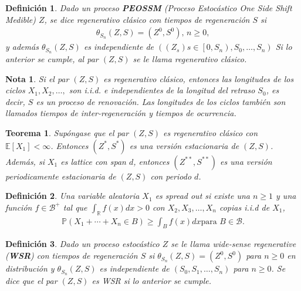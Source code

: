 \documentclass{article}
\newtheorem{Def}{Definición}[section]
\newtheorem{Teo}{Teorema}[section]
\newtheorem{Note}{Nota}[section]
\newcommand{\rea}{\mathbb{R}}
\newcommand{\esp}{\mathbb{E}}
\newcommand{\prob}{\mathbb{P}}
\numberwithin{equation}{section}
\begin{document}
\begin{Def}
Dado un proceso \textbf{PEOSSM} (Proceso Estoc\'astico One Side Shift Medible) $Z$, se dice regenerativo cl\'asico con tiempos de regeneraci\'on $S$ si 
\begin{eqnarray*}
\theta_{S_{n}}\left(Z,S\right)=\left(Z^{0},S^{0}\right)\textrm{, }n\geq0,
\end{eqnarray*}
y adem\'as $\theta_{S_{n}}\left(Z,S\right)$ es independiente de $\left(\left(Z_{s}\right)s\in\left[0,S_{n}\right),S_{0},\ldots,S_{n}\right)$
Si lo anterior se cumple, al par $\left(Z,S\right)$ se le llama regenerativo cl\'asico.
\end{Def}

\begin{Note}
Si el par $\left(Z,S\right)$ es regenerativo cl\'asico, entonces las longitudes de los ciclos $X_{1},X_{2},\ldots,$ son i.i.d. e independientes de la longitud del retraso $S_{0}$, es decir, $S$ es un proceso de renovaci\'on. Las longitudes de los ciclos tambi\'en son llamados tiempos de inter-regeneraci\'on y tiempos de ocurrencia.
\end{Note}

\begin{Teo}\label{Tma.Reg.Clasico}
Sup\'ongase que el par $\left(Z,S\right)$ es regenerativo cl\'asico con $\esp\left[X_{1}\right]<\infty$. Entonces $\left(Z^{*},S^{*}\right)$ es una versi\'on estacionaria de $\left(Z,S\right)$. Adem\'as, si $X_{1}$ es lattice con span $d$, entonces $\left(Z^{**},S^{**}\right)$ es una versi\'on periodicamente estacionaria de $\left(Z,S\right)$ con periodo $d$.

\end{Teo}

\begin{Def}
Una variable aleatoria $X_{1}$ es \textit{spread out} si existe una $n\geq1$ y una  funci\'on $f\in\mathcal{B}^{+}$ tal que $\int_{\rea}f\left(x\right)dx>0$ con $X_{2},X_{3},\ldots,X_{n}$ copias i.i.d  de $X_{1}$, 
\begin{eqnarray}
\prob\left(X_{1}+\cdots+X_{n}\in B\right)\geq\int_{B}f\left(x\right)dx\textrm{para }B\in\mathcal{B}.
\end{eqnarray}
\end{Def}

\begin{Def}
Dado un proceso estoc\'astico $Z$ se le llama \textit{wide-sense regenerative} (\textbf{WSR}) con tiempos de regeneraci\'on $S$ si $\theta_{S_{n}}\left(Z,S\right)=\left(Z^{0},S^{0}\right)$ para $n\geq0$ en distribuci\'on y $\theta_{S_{n}}\left(Z,S\right)$ es independiente de $\left(S_{0},S_{1},\ldots,S_{n}\right)$ para $n\geq0$.
Se dice que el par $\left(Z,S\right)$ es WSR si lo anterior se cumple.
\end{Def}
\end{document}
